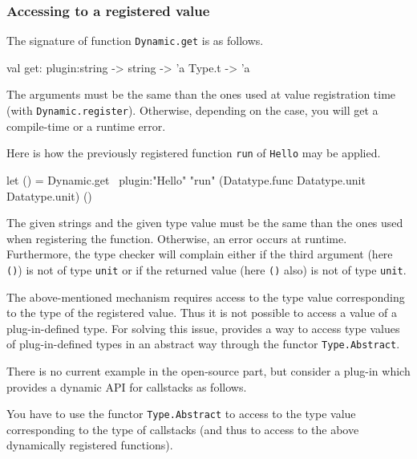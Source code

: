 \subsubsection{Accessing to a registered value}

The signature of function
\texttt{Dynamic.get} is as
follows.
\begin{ocamlcode}
val get: plugin:string -> string -> 'a Type.t -> 'a
\end{ocamlcode}
The arguments must be the same than the ones used at value registration time
(with \texttt{Dynamic.register}). Otherwise,
depending on the case, you will get a compile-time or a runtime error.

\begin{example}
  Here is how the previously registered function \texttt{run} of
  \texttt{Hello} may be applied.
\begin{ocamlcode}
let () =
  Dynamic.get
    ~plugin:"Hello"
    "run"
    (Datatype.func Datatype.unit Datatype.unit)
    ()
\end{ocamlcode}
The given strings and the given type value must be the same
than the ones used when registering the function. Otherwise, an error occurs at
runtime. Furthermore, the \caml type checker will complain either if the third
argument (here \texttt{()}) is not of type \texttt{unit} or if the returned
value (here \texttt{()} also) is not of type \texttt{unit}.
\end{example}

The above-mentioned mechanism requires access to the type
value corresponding to the type of the registered value. Thus
it is not possible to access a value of a plug-in-defined type. For solving
this issue, \framac provides a way to access type values of
plug-in-defined types in an abstract way through the functor
\texttt{Type.Abstract}.

\begin{example}
There is no current example in the \framac open-source part, but consider a
plug-in which provides a dynamic API for callstacks as follows.

You have to use the functor \texttt{Type.Abstract} to access to the type value
corresponding to the type of callstacks (and thus to access to the above
dynamically registered functions).
\end{example}

